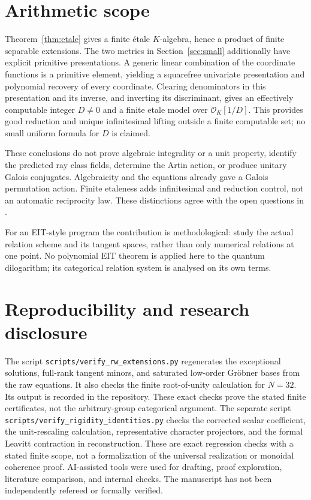 \documentclass[11pt]{article}
\theoremstyle{remark}
\begin{document}
\section{Arithmetic scope}
Theorem~\ref{thm:etale} gives a finite \'{e}tale $K$-algebra, hence a
product of finite separable extensions. The two metrics in
Section~\ref{sec:small} additionally have explicit primitive presentations.
A generic linear combination of the coordinate functions is a primitive
element, yielding a squarefree univariate presentation and polynomial
recovery of every coordinate. Clearing denominators in this presentation and
its inverse, and inverting its discriminant, gives an effectively computable
integer $D\ne0$ and a finite etale model over $\mathcal O_K[1/D]$.
This provides good reduction and unique infinitesimal lifting outside a
finite computable set; no small uniform formula for $D$ is claimed.

These conclusions do not prove algebraic integrality or a unit property,
identify the predicted ray class fields, determine the Artin action, or
produce unitary Galois conjugates. Algebraicity and the equations already
gave a Galois permutation action. Finite etaleness adds infinitesimal and
reduction control, not an automatic reciprocity law. These distinctions
agree with the open questions in \cite[\S6]{RW}.

For an EIT-style program the contribution is methodological: study the
actual relation scheme and its tangent spaces, rather than only numerical
relations at one point. No polynomial EIT theorem is applied here to the
quantum dilogarithm; its categorical relation system is analysed on its own
terms.

\section*{Reproducibility and research disclosure}
The script \texttt{scripts/verify\_rw\_extensions.py} regenerates the
exceptional solutions, full-rank tangent minors, and saturated low-order
Gr\"obner bases from the raw equations. It also checks the finite
root-of-unity calculation for $N=32$. Its output is recorded in the
repository. These exact checks prove the stated finite certificates, not
the arbitrary-group categorical argument. The separate script
\texttt{scripts/verify\_rigidity\_identities.py} checks the corrected scalar
coefficient, the unit-rescaling calculation, representative character
projectors, and the formal Leavitt contraction in reconstruction. These
are exact regression checks with a stated finite scope, not a formalization
of the universal realization or monoidal coherence proof. AI-assisted tools were used
for drafting, proof exploration, literature comparison, and internal checks.
The manuscript has not been independently refereed or formally verified.
\end{document}
